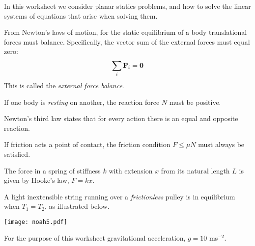 In this worksheet we consider planar statics problems, and how to solve the linear systems of equations that arise when solving them.

From Newton's laws of motion, for the static equilibrium of a body translational forces must balance. Specifically, the vector sum of the external forces must equal zero:
\begin{equation} \label{eq:trans}
 \sum_{i} {\bf F}_{i}= \bf{0}
\end{equation}
This is called the {\em external force balance}. 

If one body is {\em resting} on another, the reaction force $N$ must be positive.

Newton's third law states that for every action there is an equal and opposite reaction. 

If friction acts a point of contact, the friction condition $F\leq \mu N$ must always be satisfied.

The force in a spring of stiffness $k$ with extension $x$ from its natural length $L$ is given by Hooke's law, $F=kx$.

A light inextensible string running over a {\em frictionless} pulley is in equilibrium when $T_1 = T_2$, as illustrated below.

\begin{center}
	\texttt{[image: noah5.pdf]}
\end{center}

For the purpose of this worksheet gravitational acceleration, $g = 10$ ms$^{-2}$.